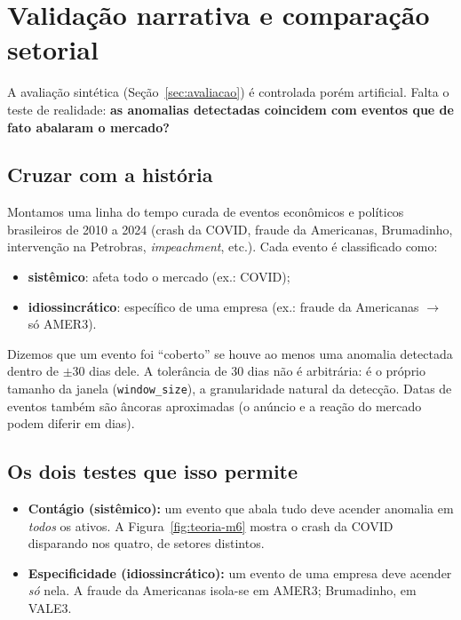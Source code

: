 \section{Validação narrativa e comparação setorial}
\label{sec:eventos}

A avaliação sintética (Seção~\ref{sec:avaliacao}) é controlada porém artificial.
Falta o teste de realidade: \textbf{as anomalias detectadas coincidem com eventos
que de fato abalaram o mercado?}

\subsection{Cruzar com a história}
Montamos uma linha do tempo curada de eventos econômicos e políticos brasileiros
de 2010 a 2024 (crash da COVID, fraude da Americanas, Brumadinho, intervenção na
Petrobras, \emph{impeachment}, etc.). Cada evento é classificado como:
\begin{itemize}[noitemsep]
  \item \textbf{sistêmico}: afeta todo o mercado (ex.: COVID);
  \item \textbf{idiossincrático}: específico de uma empresa (ex.: fraude da
        Americanas $\to$ só AMER3).
\end{itemize}

\begin{definicao}
Dizemos que um evento foi ``coberto'' se houve ao menos uma anomalia detectada
dentro de $\pm 30$ dias dele. A tolerância de 30 dias não é arbitrária: é o
próprio tamanho da janela (\texttt{window\_size}), a granularidade natural da
detecção. Datas de eventos também são âncoras aproximadas (o anúncio e a reação
do mercado podem diferir em dias).
\end{definicao}

\subsection{Os dois testes que isso permite}
\begin{itemize}[noitemsep]
  \item \textbf{Contágio (sistêmico):} um evento que abala tudo deve acender
        anomalia em \emph{todos} os ativos. A Figura~\ref{fig:teoria-m6} mostra o
        crash da COVID disparando nos quatro, de setores distintos.
  \item \textbf{Especificidade (idiossincrático):} um evento de uma empresa deve
        acender \emph{só} nela. A fraude da Americanas isola-se em AMER3;
        Brumadinho, em VALE3.
\end{itemize}

